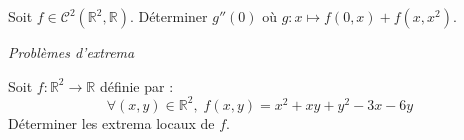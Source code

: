 \documentclass[a4paper,10pt]{report}
\begin{document}
\begin{Exercice}{} Soit $f \in \mathcal{C}^2(\mathbb{R}^2, \mathbb{R})$. Déterminer $g''(0)$ où $g : x \mapsto f(0,x)+f(x,x^2)$.
\end{Exercice}

 
 
 \medskip
 
 \begin{center}
\textit{{ {\large Problèmes d'extrema}}}
\end{center}

\begin{Exercice}{} Soit $f : \mathbb{R}^2 \rightarrow \mathbb{R}$ définie par :
$$ \forall (x,y) \in \mathbb{R}^2, \; f(x,y) = x^{2} + xy + y^{2} - 3x - 6y$$
Déterminer les extrema locaux de $f$.
\end{Exercice}
\end{document}
